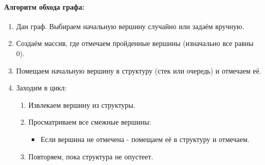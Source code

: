 {\paragraph{Алгоритм обхода графа:}
\begin{enumerate}
  \item Дан граф. Выбираем начальную вершину случайно или задаём вручную.
  \item Создаём массив, где отмечаем пройденные вершины (изначально все равны 0).
  \item Помещаем начальную вершину в структуру (стек или очередь) и отмечаем её.
  \item Заходим в цикл:
  \begin{enumerate}
    \item Извлекаем вершину из структуры.
    \item Просматриваем все смежные вершины:
    \begin{itemize}
      \item Если вершина не отмечена - помещаем её в структуру и отмечаем.
    \end{itemize}
    \item Повторяем, пока структура не опустеет.
  \end{enumerate}
\end{enumerate}


    \newpage
}
